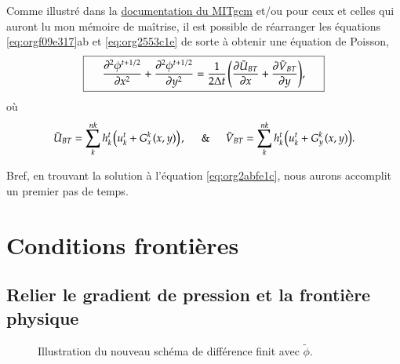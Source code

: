\documentclass[10pt]{article}
\numberwithin{equation}{section}
\newcommand{\pt}{\hspace{1pt}}
\begin{document}
Comme illustré dans la \href{http://mitgcm.org/public/r2\_manual/final/online\_documents/node33.html}{documentation du MITgcm} et/ou pour ceux et celles qui auront lu mon mémoire de maîtrise, il est possible de réarranger les équations \ref{eq:orgf09e317}ab et \ref{eq:org2553c1e} de sorte à obtenir une équation de Poisson,
\begin{equation}
\label{eq:org2abfe1c}
\boxed{\hspace{0.5cm} \pdv[2]{\phi^{t+1/2}}{x} + \pdv[2]{\phi^{t+1/2}}{y} = \frac{1}{2\Delta t}\pt \qty(\pdv{ \tilde{U}_{BT}}{x} + \pdv{\tilde{V}_{BT}}{y}),\hspace{0.5cm} }
\end{equation}
où
\begin{equation}
\tilde{U}_{BT} = \sum_k^{nk} h_k^t\pt \qty(u^t_k + G^k_x\pt(x,y))\pt,
\hspace{0.5cm}\&\hspace{0.5cm}
\tilde{V}_{BT} = \sum_k^{nk} h^t_k\pt \qty(u^t_k + G^k_y\pt(x,y)).
\end{equation}

Bref, en trouvant la solution à l'équation \ref{eq:org2abfe1c}, nous aurons accomplit un premier pas de temps. \newpage

\section{Conditions frontières}
\label{sec:org7ecc9c6}

\subsection{Relier le gradient de pression et la frontière physique}
\label{sec:orgb0274d3}

\begin{wrapfigure}[12]{r}{0.35\textwidth}
\vspace{-\baselineskip}
\centering
{}
\caption{\label{org2faaec1}Illustration du nouveau schéma de différence finit avec \(\tilde{\phi}\).}
\end{wrapfigure}
\end{document}
